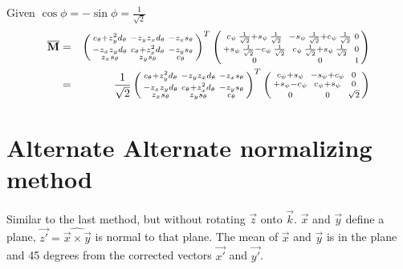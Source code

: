 \documentclass{article}
\def\matrix#1{\overline{\bf{#1}}}
\begin{document}
Given $\cos\phi = -\sin\phi = \frac{1}{\sqrt{2}}$
\begin{eqnarray}
	\matrix{M} &=& 
	\begin{pmatrix}
		\begin{smallmatrix}
			c_\theta + z_y^2d_\theta &  -z_yz_xd_\theta & -z_xs_\theta \\
			-z_xz_yd_\theta & c_\theta + z_x^2d_\theta & - z_ys_\theta \\
			z_xs_\theta & z_ys_\theta & c_\theta
		\end{smallmatrix}
	\end{pmatrix}^T
	\begin{pmatrix}
	\begin{smallmatrix}
		c_\psi\,\frac{1}{\sqrt{2}}+s_\psi\,\frac{1}{\sqrt{2}} &  -s_\psi\,\frac{1}{\sqrt{2}} +c_\psi\,\frac{1}{\sqrt{2}} & 0 \\
		+s_\psi\,\frac{1}{\sqrt{2}} -c_\psi\,\frac{1}{\sqrt{2}} & c_\psi\,\frac{1}{\sqrt{2}}+s_\psi\,\frac{1}{\sqrt{2}} & 0 \\
		0 & 0 & 1
	\end{smallmatrix}
	\end{pmatrix}\\
	&=& 
	\frac{1}{\sqrt{2}}\begin{pmatrix}
		\begin{smallmatrix}
			c_\theta + z_y^2d_\theta &  -z_yz_xd_\theta & -z_xs_\theta \\
			-z_xz_yd_\theta & c_\theta + z_x^2d_\theta & - z_ys_\theta \\
			z_xs_\theta & z_ys_\theta & c_\theta
		\end{smallmatrix}
	\end{pmatrix}^T
	\begin{pmatrix}
	\begin{smallmatrix}
		c_\psi+s_\psi &  -s_\psi +c_\psi & 0 \\
		+s_\psi -c_\psi & c_\psi+s_\psi & 0 \\
		0 & 0 & \sqrt{2}
	\end{smallmatrix}
	\end{pmatrix}
\end{eqnarray}
\section{Alternate Alternate normalizing method}
Similar to the last method, but without rotating $\vec{z}$ onto $\vec{k}$. $\vec{x}$ and $\vec{y}$ define a plane, $\vec{z'}=\widehat{\vec{x}\times\vec{y}}$ is normal to that plane. The mean of $\vec{x}$ and $\vec{y}$ is in the plane and 45 degrees from the corrected vectors $\vec{x'}$ and $\vec{y'}$.
\end{document}
